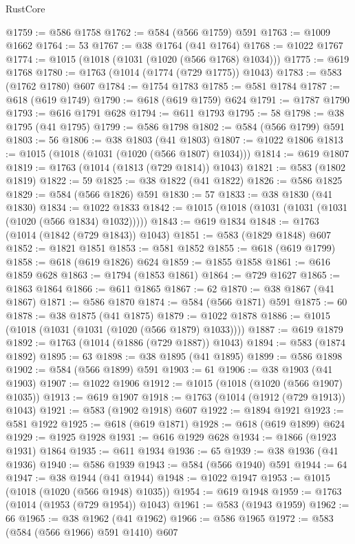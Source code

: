 \begin{lexlean}{RustCore}
\begin{coremodule}
@1759 := @586 @1758
@1762 := @584 (@566 @1759) @591
@1763 := @1009 @1662
@1764 := 53
@1767 := @38 @1764 (@41 @1764)
@1768 := @1022 @1767
@1774 := @1015 (@1018 (@1031 (@1020 (@566 @1768) @1034)))
@1775 := @619 @1768
@1780 := @1763 (@1014 (@1774 (@729 @1775)) @1043)
@1783 := @583 (@1762 @1780) @607
@1784 := @1754 @1783
@1785 := @581 @1784
@1787 := @618 (@619 @1749)
@1790 := @618 (@619 @1759) @624
@1791 := @1787 @1790
@1793 := @616 @1791 @628
@1794 := @611 @1793
@1795 := 58
@1798 := @38 @1795 (@41 @1795)
@1799 := @586 @1798
@1802 := @584 (@566 @1799) @591
@1803 := 56
@1806 := @38 @1803 (@41 @1803)
@1807 := @1022 @1806
@1813 := @1015 (@1018 (@1031 (@1020 (@566 @1807) @1034)))
@1814 := @619 @1807
@1819 := @1763 (@1014 (@1813 (@729 @1814)) @1043)
@1821 := @583 (@1802 @1819)
@1822 := 59
@1825 := @38 @1822 (@41 @1822)
@1826 := @586 @1825
@1829 := @584 (@566 @1826) @591
@1830 := 57
@1833 := @38 @1830 (@41 @1830)
@1834 := @1022 @1833
@1842 := @1015 (@1018 (@1031 (@1031 (@1031 (@1020 (@566 @1834) @1032)))))
@1843 := @619 @1834
@1848 := @1763 (@1014 (@1842 (@729 @1843)) @1043)
@1851 := @583 (@1829 @1848) @607
@1852 := @1821 @1851
@1853 := @581 @1852
@1855 := @618 (@619 @1799)
@1858 := @618 (@619 @1826) @624
@1859 := @1855 @1858
@1861 := @616 @1859 @628
@1863 := @1794 (@1853 @1861)
@1864 := @729 @1627
@1865 := @1863 @1864
@1866 := @611 @1865
@1867 := 62
@1870 := @38 @1867 (@41 @1867)
@1871 := @586 @1870
@1874 := @584 (@566 @1871) @591
@1875 := 60
@1878 := @38 @1875 (@41 @1875)
@1879 := @1022 @1878
@1886 := @1015 (@1018 (@1031 (@1031 (@1020 (@566 @1879) @1033))))
@1887 := @619 @1879
@1892 := @1763 (@1014 (@1886 (@729 @1887)) @1043)
@1894 := @583 (@1874 @1892)
@1895 := 63
@1898 := @38 @1895 (@41 @1895)
@1899 := @586 @1898
@1902 := @584 (@566 @1899) @591
@1903 := 61
@1906 := @38 @1903 (@41 @1903)
@1907 := @1022 @1906
@1912 := @1015 (@1018 (@1020 (@566 @1907) @1035))
@1913 := @619 @1907
@1918 := @1763 (@1014 (@1912 (@729 @1913)) @1043)
@1921 := @583 (@1902 @1918) @607
@1922 := @1894 @1921
@1923 := @581 @1922
@1925 := @618 (@619 @1871)
@1928 := @618 (@619 @1899) @624
@1929 := @1925 @1928
@1931 := @616 @1929 @628
@1934 := @1866 (@1923 @1931) @1864
@1935 := @611 @1934
@1936 := 65
@1939 := @38 @1936 (@41 @1936)
@1940 := @586 @1939
@1943 := @584 (@566 @1940) @591
@1944 := 64
@1947 := @38 @1944 (@41 @1944)
@1948 := @1022 @1947
@1953 := @1015 (@1018 (@1020 (@566 @1948) @1035))
@1954 := @619 @1948
@1959 := @1763 (@1014 (@1953 (@729 @1954)) @1043)
@1961 := @583 (@1943 @1959)
@1962 := 66
@1965 := @38 @1962 (@41 @1962)
@1966 := @586 @1965
@1972 := @583 (@584 (@566 @1966) @591 @1410) @607

\end{coremodule}
\end{lexlean}
